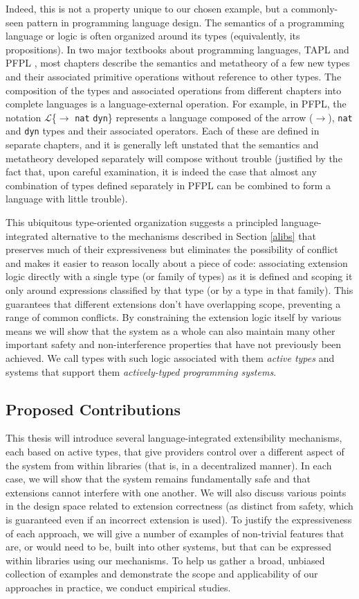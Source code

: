 Indeed, this is not a property unique to our chosen example, but a commonly-seen pattern in programming language design. The semantics of a programming language or logic is often organized around its types (equivalently, its propositions). In two major textbooks about programming languages, TAPL \cite{tapl} and PFPL \cite{pfpl}, most chapters describe the semantics and metatheory of a few new types and their associated primitive operations without reference to other types. The composition of the types and associated operations from different chapters into complete languages is a language-external operation. For example, in PFPL, the notation $\mathcal{L}$\{$\rightarrow$ \verb|nat| \verb|dyn|\} represents a language composed of the arrow ($\rightarrow$), \verb|nat| and \verb|dyn| types and their associated operators. Each of these are defined in separate chapters, and it is generally left unstated that the semantics and metatheory developed separately will compose without trouble (justified by the fact that, upon careful examination, it is indeed the case that almost any combination of types defined separately in PFPL can be combined to form a language with little trouble). 

This ubiquitous type-oriented organization suggests a principled language-integrated alternative to the mechanisms described in Section \ref{alibs} that preserves much of their expressiveness but eliminates the possibility of conflict and makes it easier to reason locally about a piece of code: associating extension logic directly with a single type (or family of types) as it is defined and scoping it only around expressions classified by that type (or by a type in that family). This guarantees that different extensions don't have overlapping scope, preventing a range of common conflicts. By constraining the extension logic itself by various means we will show that the system as a whole can also maintain many other important safety and non-interference properties that have not previously been achieved. We call types with such logic associated with them \emph{active types} and systems that support them \emph{actively-typed programming systems}. 

\subsection{Proposed Contributions}
This thesis will introduce several language-integrated extensibility mechanisms, each based on active types, that give providers control over a different aspect of the system from within libraries (that is, in a decentralized manner). In each case, we will show that the system remains fundamentally safe and that extensions cannot interfere with one another. We will also discuss various points in the design space related to extension correctness (as distinct from safety, which is guaranteed even if an incorrect extension is used). To justify the  expressiveness of each approach, we will give a number of examples of non-trivial features that are, or would need to be, built into other systems, but that can be expressed within libraries using our mechanisms. To help us gather a broad, unbiased collection of examples and demonstrate the scope and applicability of our approaches in practice, we conduct empirical studies.


